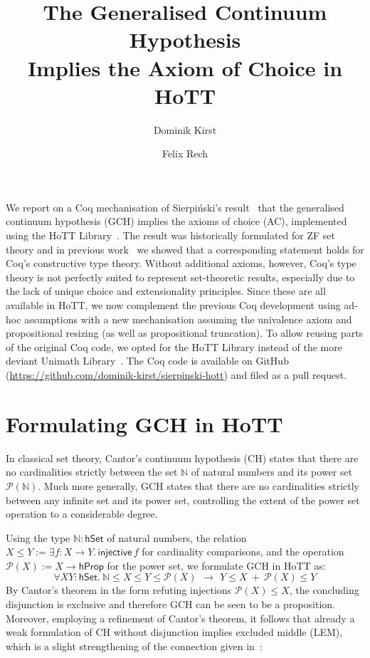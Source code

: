 \documentclass{easychair}
\title{The Generalised Continuum Hypothesis\\Implies the Axiom of Choice in HoTT}
\author{Dominik Kirst \and Felix Rech}
\institute{Saarland University, Saarland Informatics Campus, Germany}
\newcommand{\nat}{\mathbb{N}}
\newcommand{\pow}{\mathcal{P}}
\newcommand{\hprop}{\mathsf{hProp}}
\newcommand{\hset}{\mathsf{hSet}}
\begin{document}
\maketitle

We report on a Coq mechanisation of Sierpi\'nski's result~\cite{sierpinski1947hypothese} that the generalised continuum hypothesis (GCH) implies the axioms of choice (AC), implemented using the HoTT Library~\cite{bauer2017hott}.
The result was historically formulated for ZF set theory and in previous work~\cite{kirst2021generalised} we showed that a corresponding statement holds for Coq's constructive type theory.
Without additional axioms, however, Coq's type theory is not perfectly suited to represent set-theoretic results, especially due to the lack of unique choice and extensionality principles.
Since these are all available in HoTT, we now complement the previous Coq development using ad-hoc assumptions with a new mechanisation assuming the univalence axiom and propositional resizing (as well as propositional truncation).
To allow reusing parts of the original Coq code, we opted for the HoTT Library instead of the more deviant Unimath Library~\cite{UniMath}.
The Coq code is available on GitHub (\url{https://github.com/dominik-kirst/sierpinski-hott}) and filed as a pull request.

\section{Formulating GCH in HoTT}

In classical set theory, Cantor's continuum hypothesis (CH) states that there are no cardinalities strictly between the set $\nat$ of natural numbers and its power set $\pow(\nat)$.
Much more generally, GCH states that there are no cardinalities strictly between any infinite set and its power set, controlling the extent of the power set operation to a considerable degree.

Using the type $\nat:\hset$ of natural numbers, the relation $X\le Y:=\exists f:X\to Y.\, \mathsf{injective}\,f$ for cardinality comparisons, and the operation $\pow(X):=X\to\hprop$ for the power set, we formulate GCH in HoTT as:
$$\forall X Y:\hset.~\nat \le X\le Y\le \pow(X)~\,\to~\, Y\le X ~+~ \pow(X)\le Y$$
By Cantor's theorem in the form refuting injections $\pow(X)\le X$, the concluding disjunction is exclusive and therefore GCH can be seen to be a proposition.
Moreover, employing a refinement of Cantor's theorem, it follows that already a weak formulation of CH without disjunction implies excluded middle (LEM), which is a slight strengthening of the connection given in~\cite{bridges2016continuum}:
\end{document}
